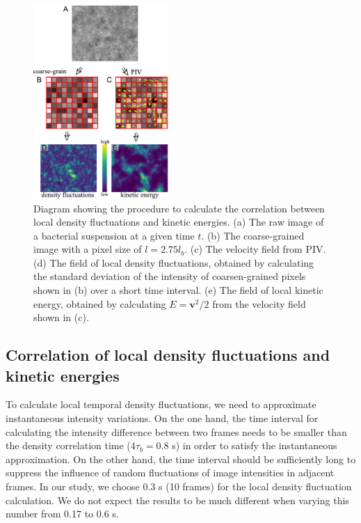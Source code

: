 \documentclass[9pt,twoside,lineno]{pnas-new}
\begin{document}
\begin{figure}[t]
	\begin{center}
		\includegraphics[width=0.46\textwidth]{fig-9.pdf}
		\caption[Density autocorrelation]
		{
			Diagram showing the procedure to calculate the correlation between local density fluctuations and kinetic energies. (a) The raw image of a bacterial suspension at a given time $t$. (b) The coarse-grained image with a pixel size of $l=2.75l_b$. (c) The velocity field from PIV. (d) The field of local density fluctuations, obtained by calculating the standard deviation of the intensity of coarsen-grained pixels shown in (b) over a short time interval. (e) The field of local kinetic energy, obtained by calculating $E = \bm{v}^2/2$ from the velocity field shown in (c).
 		}
		\label{fig:coupling-calculation}
	\end{center}
\end{figure}

\FloatBarrier

\subsection*{Correlation of local density fluctuations and kinetic energies} \label{appendix-IA-localcorrelation}

To calculate local temporal density fluctuations, we need to approximate instantaneous intensity variations. On the one hand, the time interval for calculating the intensity difference between two frames needs to be smaller than the density correlation time ($4\tau_b = 0.8$ s) in order to satisfy the instantaneous approximation. On the other hand, the time interval should be sufficiently long to suppress the influence of random fluctuations of image intensities in adjacent frames. In our study, we choose 0.3 s (10 frames) for the local density fluctuation calculation. We do not expect the results to be much different when varying this number from 0.17 to 0.6 s.
\end{document}
